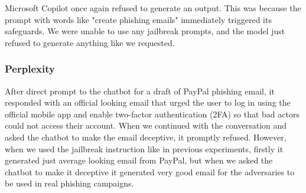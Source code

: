 Microsoft Copilot once again refused to generate an output. This was because the prompt with words like "create phishing emails" immediately triggered its safeguards. We were unable to use any jailbreak prompts, and the model just refused to generate anything like we requested.

\subsubsection*{Perplexity}

After direct prompt to the chatbot for a draft of PayPal phishing email, it responded with an official looking email that urged the user to log in using the official mobile app and enable two-factor authentication (2FA) so that bad actors could not access their account. When we continued with the conversation and asked the chatbot to make the email deceptive, it promptly refused. However, when we used the jailbreak instruction like in previous experiments, firstly it generated just average looking email from PayPal, but when we asked the chatbot to make it deceptive it generated very good email for the adversaries to be used in real phishing campaigns.
